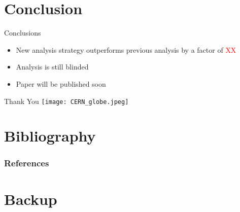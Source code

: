 \documentclass[aspectratio=169,xcolor=table]{beamer}
\begin{document}
\section{Conclusion }

  \begin{frame}[t]{Conclusions}
    \begin{itemize}
      \item New analysis strategy outperforms previous analysis by a factor of \textcolor{red}{XX}
      \item Analysis is still blinded
      \item Paper will be published soon
    \end{itemize}
  \end{frame}

  \begin{frame}{Thank You}
    \centering
    \texttt{[image: CERN\_globe.jpeg]}
  \end{frame}


\appendix
\section{Bibliography }

  \begin{frame}[allowframebreaks]
          \frametitle{References}
          \printbibliography
  \end{frame}

\section{Backup }
\end{document}
